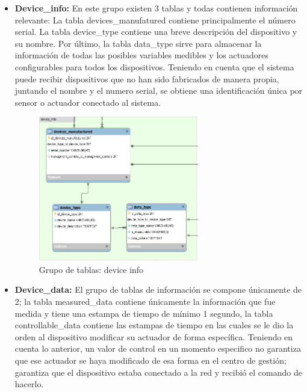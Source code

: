\begin{itemize}
	\item \textbf{Device\_info:} En este grupo existen 3 tablas y todas contienen información relevante: La tabla devices\_manufatured contiene principalmente el número serial. La tabla device\_type contiene una breve descripción del dispositivo y su nombre. Por último, la tabla  data\_type sirve para almacenar la información de todas las posibles variables medibles y los actuadores configurables para todos los dispositivos. Teniendo en cuenta que el sistema puede recibir dispositivos que no han sido fabricados de manera propia, juntando el nombre y el numero serial, se obtiene una identificación única por sensor o actuador conectado al sistema. 
	
	\begin{figure}[htbp]
		\centerline{\includegraphics[width=7cm]{figuras/device_info.png}}
		\caption{Grupo de tablas: device info}
		\label{fig_26}
	\end{figure}
	
	\item \textbf{Device\_data:} El grupo de tablas de información se compone únicamente de 2; la tabla measured\_data contiene únicamente la información que fue medida y tiene una estampa de tiempo de mínimo 1 segundo, la tabla controllable\_data contiene las estampas de tiempo en las cuales se le dio la orden al dispositivo modificar su actuador de forma específica. Teniendo en cuenta lo anterior, un valor de control en un momento especifico no garantiza que ese actuador se haya modificado de esa forma en el centro de gestión; garantiza que el dispositivo estaba conectado a la red y recibió el comando de hacerlo.
	

\end{itemize}
